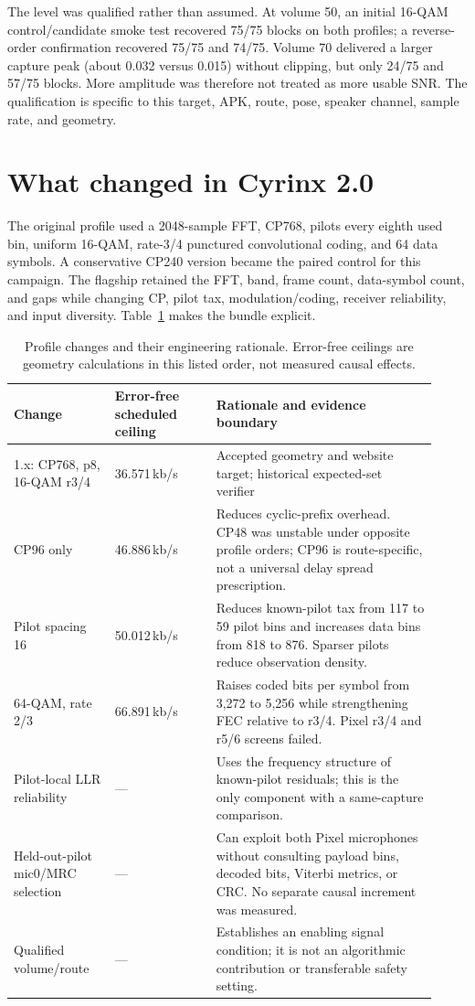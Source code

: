 \documentclass[11pt]{article}
\begin{document}
The level was qualified rather than assumed. At volume 50, an initial
16-QAM control/candidate smoke test recovered 75/75 blocks on both profiles;
a reverse-order confirmation recovered 75/75 and 74/75. Volume 70 delivered
a larger capture peak (about 0.032 versus 0.015) without clipping, but only
24/75 and 57/75 blocks. More amplitude was therefore not treated as more usable
SNR. The qualification is specific to this target, APK, route, pose, speaker
channel, sample rate, and geometry.

\section{What changed in Cyrinx 2.0}
\label{sec:changes}

The original profile used a 2048-sample FFT, CP768, pilots every eighth used
bin, uniform 16-QAM, rate-3/4 punctured convolutional coding, and 64 data
symbols. A conservative CP240 version became the paired control for this
campaign. The flagship retained the FFT, band, frame count, data-symbol count,
and gaps while changing CP, pilot tax, modulation/coding, receiver reliability,
and input diversity. Table~\ref{tab:delta} makes the bundle explicit.

\begin{table}[ht]
\centering
\caption{Profile changes and their engineering rationale. Error-free ceilings
are geometry calculations in this listed order, not measured causal effects.}
\label{tab:delta}
\small
\begin{tabular}{p{0.22\linewidth}p{0.22\linewidth}p{0.48\linewidth}}
\toprule
Change & Error-free scheduled ceiling & Rationale and evidence boundary \\
\midrule
1.x: CP768, p8, 16-QAM r3/4 & 36.571\,kb/s & Accepted geometry and website
target; historical expected-set verifier \\
CP96 only & 46.886\,kb/s & Reduces cyclic-prefix overhead. CP48 was unstable
under opposite profile orders; CP96 is route-specific, not a universal delay
spread prescription. \\
Pilot spacing 16 & 50.012\,kb/s & Reduces known-pilot tax from 117 to 59 pilot
bins and increases data bins from 818 to 876. Sparser pilots reduce observation
density. \\
64-QAM, rate 2/3 & 66.891\,kb/s & Raises coded bits per symbol from 3,272 to
5,256 while strengthening FEC relative to r3/4. Pixel r3/4 and r5/6 screens
failed. \\
Pilot-local LLR reliability & --- & Uses the frequency structure of known-pilot
residuals; this is the only component with a same-capture comparison. \\
Held-out-pilot mic0/MRC selection & --- & Can exploit both Pixel microphones
without consulting payload bins, decoded bits, Viterbi metrics, or CRC. No
separate causal increment was measured. \\
Qualified volume/route & --- & Establishes an enabling signal condition; it is
not an algorithmic contribution or transferable safety setting. \\
\bottomrule
\end{tabular}
\end{table}
\end{document}
